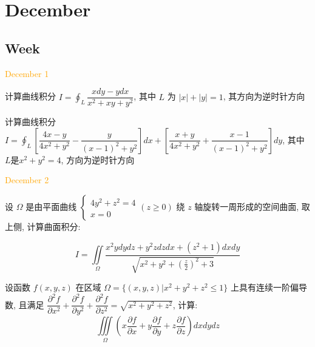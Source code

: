 \chapter{December}
\section{Week }
\textcolor{orange}{December 1}

\begin{example}[][Exam: 38.1.1]
	计算曲线积分 $\displaystyle{I=\oint_{L}\dfrac{xdy-ydx}{x^{2}+xy+y^{2}}}$, 其中 $L$ 为 $|x|+|y|=1$, 其方向为逆时针方向
\end{example}

\begin{solution}
	
\end{solution}

\begin{example}[][Exam: 38.1.2]
	计算曲线积分 $\displaystyle{I=\oint_{L}\left[\dfrac{4x-y}{4x^{2}+y^{2}}-\dfrac{y}{(x-1)^{2}+y^{2}} \right]dx+\left[\dfrac{x+y}{4x^{2}+y^{2}}+\dfrac{x-1}{(x-1)^{2}+y^{2}} \right]dy}$,
	其中 $L$是$x^{2}+y^{2}=4$, 方向为逆时针方向
\end{example}

\begin{solution}
	
\end{solution}


\textcolor{orange}{December 2 }

\begin{example}[][Exam: 38.1.3]
	设 $\Omega$ 是由平面曲线 $
	\begin{cases}
		4y^{2}+z^{2}=4\\
		x=0
	\end{cases}(z\geq 0)$ 绕 $z$ 轴旋转一周形成的空间曲面, 取上侧, 计算曲面积分:
	
	$$I=\iint\limits_{\Omega}\dfrac{x^{2}ydydz+y^{2}zdzdx+(z^{2}+1)dxdy}{\sqrt{x^{2}+y^{2}+(\frac{z}{2})^{2}+3}}$$
\end{example}

\begin{solution}
	
\end{solution}

\begin{example}[][Exam: 38.1.4]
	设函数 $f(x,y,z)$ 在区域 $\Omega=\{(x,y,z)|x^{2}+y^{2}+z^{2}\leq 1\}$ 上具有连续一阶偏导数,
	且满足 $\dfrac{\partial^{2}f}{\partial x^{2}}+\dfrac{\partial^{2}f}{\partial y^{2}}+\dfrac{\partial^{2}f}{\partial z^{2}}=\sqrt{x^{2}+y^{2}+z^{2}}$, 计算: 
	$$\iiint\limits_{\Omega}(x\dfrac{\partial f}{\partial x}+y\dfrac{\partial f}{\partial y}+z\dfrac{\partial f}{\partial z})dxdydz$$
\end{example}

